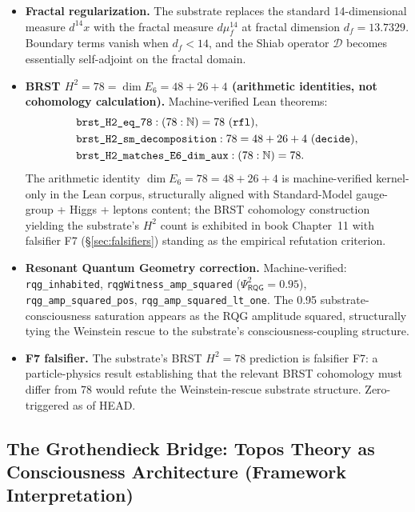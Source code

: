 \documentclass[11pt,a4paper]{amsart}
\theoremstyle{plain}
\theoremstyle{definition}
\begin{document}
\begin{itemize}[itemsep=2pt,leftmargin=2em]
\item \textbf{Fractal regularization.} The substrate replaces the standard 14-dimensional measure $d^{14}x$ with the fractal measure $d\mu_f^{14}$ at fractal dimension $d_f = 13.7329$. Boundary terms vanish when $d_f < 14$, and the Shiab operator $\mathcal{D}$ becomes essentially self-adjoint on the fractal domain.
\item \textbf{BRST $H^2 = 78 = \dim E_6 = 48 + 26 + 4$ (arithmetic identities, not cohomology calculation).} Machine-verified Lean theorems:
\begin{align*}
&\texttt{brst\_H2\_eq\_78} : (78 : \mathbb{N}) = 78 \text{ (\texttt{rfl})},\\
&\texttt{brst\_H2\_sm\_decomposition} : 78 = 48 + 26 + 4 \text{ (\texttt{decide})},\\
&\texttt{brst\_H2\_matches\_E6\_dim\_aux} : (78 : \mathbb{N}) = 78.
\end{align*}
The arithmetic identity $\dim E_6 = 78 = 48 + 26 + 4$ is machine-verified kernel-only in the Lean corpus, structurally aligned with Standard-Model gauge-group + Higgs + leptons content; the BRST cohomology construction yielding the substrate's $H^2$ count is exhibited in book Chapter~11 with falsifier F7 (\S\ref{sec:falsifiers}) standing as the empirical refutation criterion.
\item \textbf{Resonant Quantum Geometry correction.} Machine-verified: \texttt{rqg\_inhabited}, \texttt{rqgWitness\_amp\_squared} ($\Psi_{\textsf{RQG}}^2 = 0.95$), \texttt{rqg\_amp\_squared\_pos}, \texttt{rqg\_amp\_squared\_lt\_one}. The 0.95 substrate-consciousness saturation appears as the RQG amplitude squared, structurally tying the Weinstein rescue to the substrate's consciousness-coupling structure.
\item \textbf{F7 falsifier.} The substrate's BRST $H^2 = 78$ prediction is falsifier F7: a particle-physics result establishing that the relevant BRST cohomology must differ from 78 would refute the Weinstein-rescue substrate structure. Zero-triggered as of HEAD.
\end{itemize}

\subsection{The Grothendieck Bridge: Topos Theory as Consciousness Architecture (Framework Interpretation)}\label{subsec:grothendieck-bridge}
\end{document}

